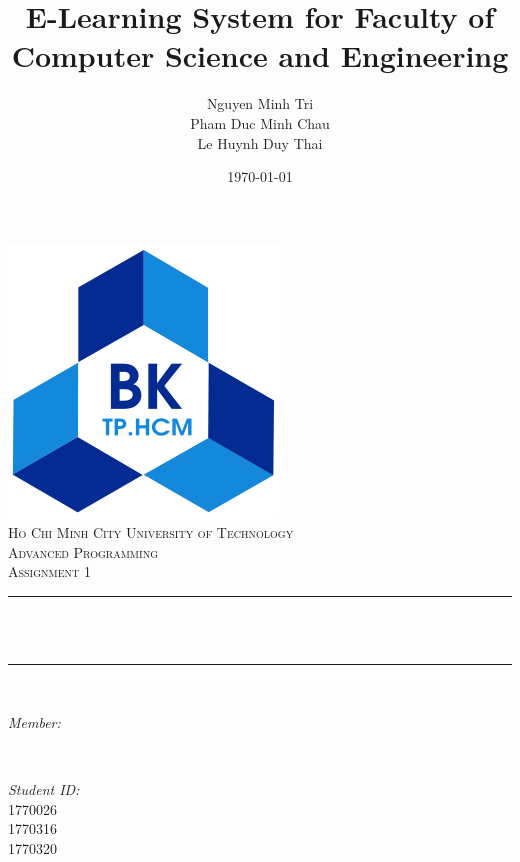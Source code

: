 \documentclass[12pt]{article}
\title{E-Learning System for Faculty of Computer Science and Engineering}                             %
\author{
  Nguyen Minh Tri\\
  Pham Duc Minh Chau\\
  Le Huynh Duy Thai\\
 }
\date{\today}                                           %
\makeatletter
\let\thetitle\@title
\let\theauthor\@author
\let\thedate\@date
\makeatother
\begin{document}

\begin{titlepage}
    \centering
    \vspace*{0.5 cm}
    \includegraphics[scale = 0.5]{hcmut.png}\\[1.0 cm]   %
    \textsc{\Large Ho Chi Minh City University of Technology}\\[1.0 cm]   %
    \textsc{\Large Advanced Programming}\\[0.5 cm]               %
    \textsc{\large Assignment 1}\\[0.5 cm]               %
    \rule{\linewidth}{0.2 mm} \\[0.4 cm]
    { \LARGE \bfseries \thetitle}\\
    \rule{\linewidth}{0.2 mm} \\[1.5 cm]
    
    \begin{minipage}{0.4\textwidth}
        \begin{flushleft} \large
            \emph{Member:}\\
            \theauthor
            \end{flushleft}
            \end{minipage}~
            \begin{minipage}{0.4\textwidth}
            \begin{flushright} \large
            \emph{Student ID:} \\
            1770026 \\
            1770316\\
            1770320\\                                  %
        \end{flushright}
    \end{minipage}\\[2 cm]
    
    {\large \thedate}\\[2 cm]
 
    \vfill
    
\end{titlepage}
\end{document}
